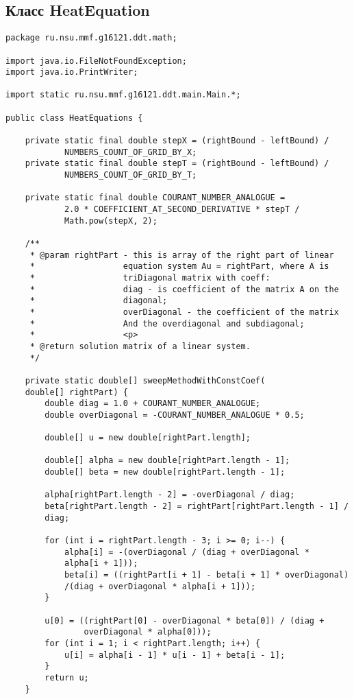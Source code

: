 \subsection{Класс HeatEquation}
\begin{verbatim}
package ru.nsu.mmf.g16121.ddt.math;

import java.io.FileNotFoundException;
import java.io.PrintWriter;

import static ru.nsu.mmf.g16121.ddt.main.Main.*;

public class HeatEquations {

    private static final double stepX = (rightBound - leftBound) /
            NUMBERS_COUNT_OF_GRID_BY_X;
    private static final double stepT = (rightBound - leftBound) /
            NUMBERS_COUNT_OF_GRID_BY_T;

    private static final double COURANT_NUMBER_ANALOGUE =
            2.0 * COEFFICIENT_AT_SECOND_DERIVATIVE * stepT /
            Math.pow(stepX, 2);

    /**
     * @param rightPart - this is array of the right part of linear
     *                  equation system Au = rightPart, where A is
     *                  triDiagonal matrix with coeff:
     *                  diag - is coefficient of the matrix A on the 
     *                  diagonal;
     *                  overDiagonal - the coefficient of the matrix
     *                  And the overdiagonal and subdiagonal;
     *                  <p>
     * @return solution matrix of a linear system.
     */

    private static double[] sweepMethodWithConstCoef(
    double[] rightPart) {
        double diag = 1.0 + COURANT_NUMBER_ANALOGUE;
        double overDiagonal = -COURANT_NUMBER_ANALOGUE * 0.5;

        double[] u = new double[rightPart.length];

        double[] alpha = new double[rightPart.length - 1];
        double[] beta = new double[rightPart.length - 1];

        alpha[rightPart.length - 2] = -overDiagonal / diag;
        beta[rightPart.length - 2] = rightPart[rightPart.length - 1] /
        diag;

        for (int i = rightPart.length - 3; i >= 0; i--) {
            alpha[i] = -(overDiagonal / (diag + overDiagonal * 
            alpha[i + 1]));
            beta[i] = ((rightPart[i + 1] - beta[i + 1] * overDiagonal)
            /(diag + overDiagonal * alpha[i + 1]));
        }

        u[0] = ((rightPart[0] - overDiagonal * beta[0]) / (diag +
                overDiagonal * alpha[0]));
        for (int i = 1; i < rightPart.length; i++) {
            u[i] = alpha[i - 1] * u[i - 1] + beta[i - 1];
        }
        return u;
    }


\end{verbatim}
